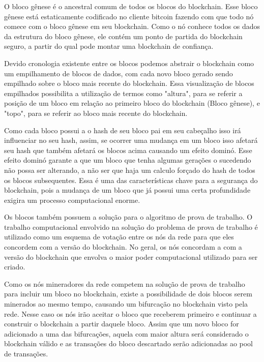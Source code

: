 \documentclass[conference,compsoc]{IEEEtran}
\begin{document}
O bloco gênese é o ancestral comum de todos os blocos do blockchain. Esse bloco gênese está estaticamente codificado no cliente bitcoin fazendo com que todo nó comece com o bloco gênese em seu blockchain. Como o nó conhece todos os dados da estrutura do bloco gênese, ele contém um ponto de partida do blockchain seguro, a partir do qual pode montar uma blockchain de confiança. 

Devido cronologia existente entre os blocos podemos abstrair o blockchain como um empilhamento de blocos de dados, com cada  novo bloco gerado sendo empilhado sobre o bloco mais recente do blockchain. Essa visualização de blocos empilhados possibilita a utilização de termos como "altura", para se referir a posição de um bloco em relação ao primeiro bloco do blockchain (Bloco gênese), e "topo", para se referir ao bloco mais recente do blockchain. 

Como cada bloco possui a o hash de seu bloco pai em seu cabeçalho isso irá influenciar no seu hash, assim, se ocorrer uma mudança em um bloco isso afetará seu hash que também afetará os blocos acima causando um efeito dominó. Esse efeito dominó garante a  que um bloco que tenha algumas gerações o sucedendo não possa ser alterando, a não ser que haja um calculo forçado do hash de todos os blocos subsequentes. Essa é uma das características chave para a segurança do blockchain, pois a mudança de um bloco que já possui uma certa profundidade exigira um processo computacional enorme.

Os blocos também possuem a solução para o algoritmo de prova de trabalho. O trabalho computacional envolvido na solução do problema de prova de trabalho é utilizado como um esquema de votação entre os nós da rede para que eles concordem com a versão do blockchain. No geral, os nós concordam a com a versão do blockchain que envolva o maior poder computacional utilizado para ser criado.

Como os nós mineradores da rede competem na solução de prova de trabalho para incluir um bloco no blockchain, existe a possibilidade de dois blocos serem minerados ao mesmo tempo, causando um bifurcação no blockchain visto pela rede. Nesse caso os nós irão aceitar o bloco que receberem primeiro e continuar a construir o blockchain a partir daquele bloco. Assim que um novo bloco for adicionado a uma das bifurcações, aquela com maior altura será considerado o blockchain válido e as transações do bloco descartado serão adicionadas ao pool de transações.
\end{document}
